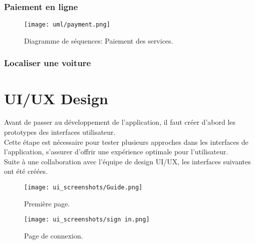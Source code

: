 \subsubsection{Paiement en ligne}
\begin{figure}[H]
    \centering
    \texttt{[image: uml/payment.png]}
    \captionsetup{justification=centering}
    \caption{Diagramme de séquences: Paiement des services.}
    \label{fig:seq_payment}
\end{figure}
\subsubsection{Localiser une voiture}
\section{UI/UX Design}
Avant de passer au développement de l'application, il faut créer d'abord les prototypes des interfaces utilisateur. \\
\noindent Cette étape est nécessaire pour tester plusieurs approches dans les interfaces de l'application, s'assurer d'offrir une expérience optimale pour l'utilisateur. \\
\noindent Suite à une collaboration avec l'équipe de design UI/UX, les interfaces suivantes ont été créées.
\vspace{1cm}
\begin{multicols}{2}
    \begin{figure}[H]
        \centering
        \texttt{[image: ui\_screenshots/Guide.png]}
        \vspace{1cm}
        \captionsetup{justification=centering}

        \caption{Première page.}
        \label{fig:start_page}
    \end{figure}
    \begin{figure}[H]
        \centering
        \texttt{[image: ui\_screenshots/sign in.png]}
        \vspace{1cm}
        \captionsetup{justification=centering}

        \caption{Page de connexion.}
        \label{fig:sign_in_page}
    \end{figure}
\end{multicols}
